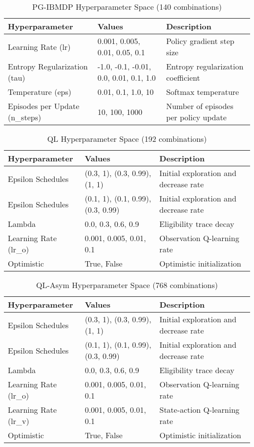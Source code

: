 \begin{table}
\small
\centering
\caption{PG-IBMDP Hyperparameter Space (140 combinations)}
\begin{tabular}{lll}
\toprule
\textbf{Hyperparameter} & \textbf{Values} & \textbf{Description} \\
\midrule
Learning Rate (lr) & 0.001, 0.005, 0.01, 0.05, 0.1 & Policy gradient step size \\
Entropy Regularization (tau) & -1.0, -0.1, -0.01, 0.0, 0.01, 0.1, 1.0 & Entropy regularization coefficient \\
Temperature (eps) & 0.01, 0.1, 1.0, 10 & Softmax temperature \\
Episodes per Update (n\_steps) & 10, 100, 1000 & Number of episodes per policy update \\
\bottomrule
\end{tabular}
\end{table}


\begin{table}
\small
\centering
\caption{QL Hyperparameter Space (192 combinations)}
\begin{tabular}{lll}
\toprule
\textbf{Hyperparameter} & \textbf{Values} & \textbf{Description} \\
\midrule
Epsilon Schedules & (0.3, 1), (0.3, 0.99), (1, 1) & Initial exploration and decrease rate \\
Epsilon Schedules & (0.1, 1), (0.1, 0.99), (0.3, 0.99) & Initial exploration and decrease rate \\
Lambda & 0.0, 0.3, 0.6, 0.9 & Eligibility trace decay \\
Learning Rate (lr\_o) & 0.001, 0.005, 0.01, 0.1 & Observation Q-learning rate \\
Optimistic & True, False & Optimistic initialization \\
\bottomrule
\end{tabular}
\end{table}

\begin{table}
\small
\centering
\caption{QL-Asym Hyperparameter Space (768 combinations)}
\begin{tabular}{lll}
\toprule
\textbf{Hyperparameter} & \textbf{Values} & \textbf{Description} \\
\midrule
Epsilon Schedules & (0.3, 1), (0.3, 0.99), (1, 1) & Initial exploration and decrease rate \\
Epsilon Schedules & (0.1, 1), (0.1, 0.99), (0.3, 0.99) & Initial exploration and decrease rate \\
Lambda & 0.0, 0.3, 0.6, 0.9 & Eligibility trace decay \\
Learning Rate (lr\_o) & 0.001, 0.005, 0.01, 0.1 & Observation Q-learning rate \\
Learning Rate (lr\_v) & 0.001, 0.005, 0.01, 0.1 & State-action Q-learning rate \\
Optimistic & True, False & Optimistic initialization \\
\bottomrule
\end{tabular}
\end{table}

